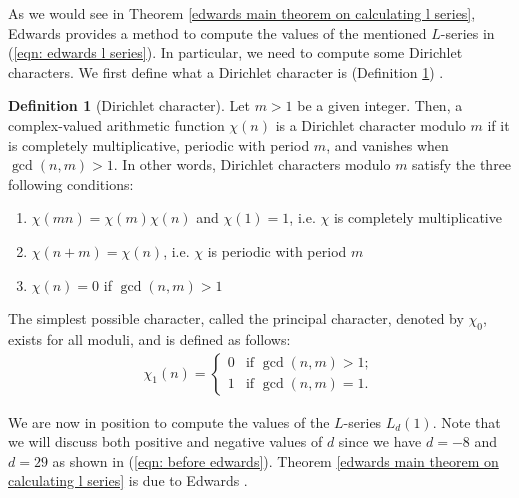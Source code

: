 \documentclass[11pt]{amsart}
\theoremstyle{definition}
\numberwithin{theorem}{section}
\newtheorem{definition}[theorem]{Definition}
\begin{document}
As we would see in Theorem \ref{edwards main theorem on calculating l series}, Edwards \cite{edwards} provides a method to compute the values of the mentioned $L$-series in (\ref{eqn: edwards l series}). In particular, we need to compute some Dirichlet characters. We first define what a Dirichlet character is (Definition \ref{dirichlet character definition}) \cite{nist-handbook}.
\begin{definition}[Dirichlet character]\label{dirichlet character definition} Let $m>1$ be a given integer. Then, a complex-valued arithmetic function $\chi\left(n\right)$ is a Dirichlet character modulo $m$ if it is completely multiplicative, periodic with period $m$, and vanishes when $\operatorname{gcd}\left(n,m\right)>1$. In other words, Dirichlet characters modulo $m$ satisfy the three following conditions:
\begin{enumerate}[label=\textbf{(\roman*)}]
    \item \(\chi\left(mn\right) = \chi\left(m\right)\chi\left(n\right)\) and $\chi\left(1\right)=1$, i.e. $\chi$ is completely multiplicative
    \item \(\chi\left(n + m\right) = \chi\left(n\right)\), i.e. \(\chi\) is periodic with period \(m\)
    \item $\chi\left(n\right)=0$ if $\operatorname{gcd}\left(n,m\right)>1$
\end{enumerate}
The simplest possible character, called the principal character, denoted by \(\chi_0\), exists for all moduli, and is defined as follows:
\begin{align*}
\chi_1\left(n\right) = 
\begin{cases} 
  0 & \text{if } \gcd\left(n,m\right) > 1; \\
  1 & \text{if } \gcd\left(n,m\right) = 1.
\end{cases}
\end{align*}
\end{definition}
We are now in position to compute the values of the $L$-series $L_d\left(1\right)$. Note that we will discuss both positive and negative values of $d$ since we have $d=-8$ and $d=29$ as shown in (\ref{eqn: before edwards}). Theorem \ref{edwards main theorem on calculating l series} is due to Edwards \cite{edwards}.
\end{document}
